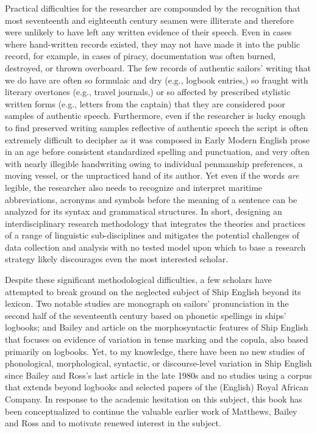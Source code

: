 Practical difficulties for the researcher are compounded by the recognition that most seventeenth and eighteenth century seamen were illiterate \citep[167]{Kelly2006} and therefore were unlikely to have left any written evidence of their speech. Even in cases where hand-written records existed, they may not have made it into the public record, for example, in cases of piracy, documentation was often burned, destroyed, or thrown overboard. The few records of authentic sailors’ writing that we do have are often so formulaic and dry (e.g., logbook entries,) so fraught with literary overtones (e.g., travel journals,) or so affected by prescribed stylistic written forms (e.g., letters from the captain) that they are considered poor samples of authentic speech. Furthermore, even if the researcher is lucky enough to find preserved writing samples reflective of authentic speech the script is often extremely difficult to decipher as it was composed in Early Modern English prose in an age before consistent standardized spelling and punctuation, and very often with nearly illegible handwriting owing to individual penmanship preferences, a moving vessel, or the unpracticed hand of its author. Yet even if the words \textit{are} legible, the researcher also needs to recognize and interpret maritime abbreviations, acronyms and symbols before the meaning of a sentence can be analyzed for its syntax and grammatical structures. In short, designing an interdisciplinary research methodology that integrates the theories and practices of a range of linguistic sub-disciplines and mitigates the potential challenges of data collection and analysis with no tested model upon which to base a research strategy likely discourages even the most interested scholar. 



Despite these significant methodological difficulties, a few scholars have attempted to break ground on the neglected subject of Ship English beyond its lexicon. Two notable studies are  monograph on sailors’ pronunciation in the second half of the seventeenth century based on phonetic spellings in ships’ logbooks; and Bailey and  article on the morphosyntactic features of Ship English that focuses on evidence of variation in tense marking and the copula, also based primarily on logbooks. Yet, to my knowledge, there have been no new studies of phonological, morphological, syntactic, or discourse-level variation in Ship English since Bailey and Ross’s last article in the late 1980s and no studies using a corpus that extends beyond logbooks and selected papers of the (English) Royal African Company. In response to the academic hesitation on this subject, this book has been conceptualized to continue the valuable earlier work of Matthews, Bailey and Ross and to motivate renewed interest in the subject.  




